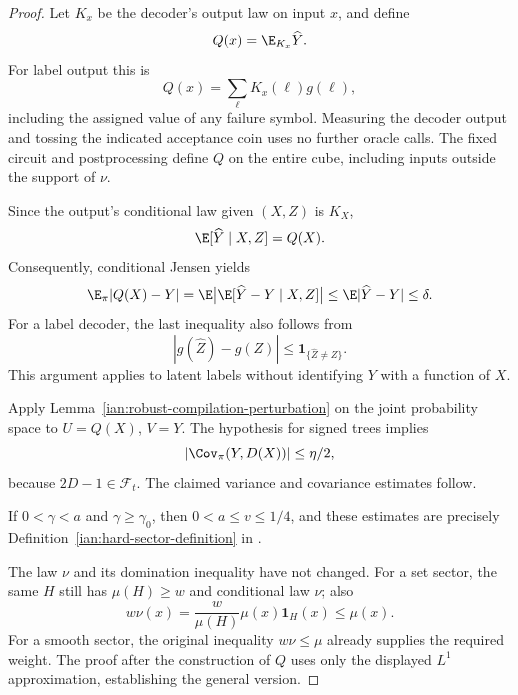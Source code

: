 \begin{proof}
Let \(K_x\) be the decoder's output law on input \(x\), and define
\[
 Q(x)=\E_{K_x}\widehat Y.
\]
For label output this is
\[
 Q(x)=\sum_{\ell}K_x(\ell)g(\ell),
\]
including the assigned value of any failure symbol.
Measuring the decoder output and tossing the indicated acceptance coin uses no further oracle calls.
The fixed circuit and postprocessing define \(Q\) on the entire cube, including inputs outside the support of \(\nu\).

Since the output's conditional law given \((X,Z)\) is \(K_X\),
\[
 \E[\widehat Y\mid X,Z]=Q(X).
\]
Consequently, conditional Jensen yields
\[
 \E_\pi|Q(X)-Y|
 =\E\bigl|\E[\widehat Y-Y\mid X,Z]\bigr|
 \le\E|\widehat Y-Y|
 \le\delta.
\]
For a label decoder, the last inequality also follows from
\[
 |g(\widehat Z)-g(Z)|
 \le\mathbf1_{\{\widehat Z\ne Z\}}.
\]
This argument applies to latent labels without identifying \(Y\) with a function of \(X\).

Apply Lemma~\ref{ian:robust-compilation-perturbation} on the joint probability space to \(U=Q(X)\), \(V=Y\).
The hypothesis for signed trees implies
\[
 |\Cov_\pi(Y,D(X))|\le\eta/2,
\]
because \(2D-1\in\mathcal F_t\).
The claimed variance and covariance estimates follow.

If \(0<\gamma<a\) and \(\gamma\ge\gamma_0\), then \(0<a\le v\le1/4\), and these estimates are precisely
Definition~\ref{ian:hard-sector-definition} in
.

The law \(\nu\) and its domination inequality have not changed.
For a set sector, the same \(H\) still has \(\mu(H)\ge w\) and conditional law \(\nu\); also
\[
 w\nu(x)
 =\frac{w}{\mu(H)}\mu(x)\mathbf1_H(x)
 \le\mu(x).
\]
For a smooth sector, the original inequality \(w\nu\le\mu\) already supplies the required weight.
The proof after the construction of \(Q\) uses only the displayed \(L^1\) approximation, establishing the general version.
\end{proof}


